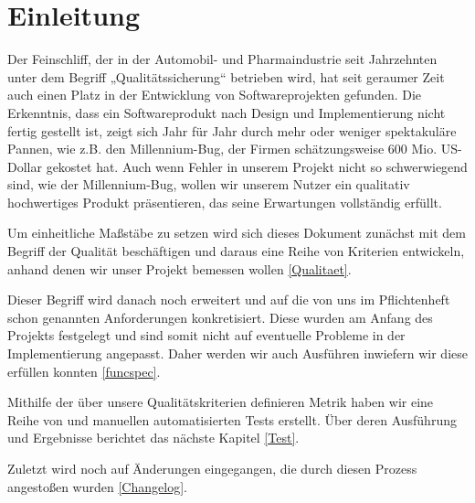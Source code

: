 \chapter{Einleitung} \label{Einleitung}

Der Feinschliff, der in der Automobil- und Pharmaindustrie seit Jahrzehnten unter dem Begriff „Qualitätssicherung“ betrieben wird, hat seit geraumer Zeit auch einen Platz in der Entwicklung von Softwareprojekten gefunden.
Die Erkenntnis, dass ein Softwareprodukt nach Design und Implementierung nicht fertig gestellt ist, zeigt sich Jahr für Jahr durch mehr oder weniger spektakuläre Pannen, wie z.B. den Millennium-Bug, der Firmen schätzungsweise 600 Mio. US-Dollar gekostet hat. Auch wenn Fehler in unserem Projekt nicht so schwerwiegend sind, wie der Millennium-Bug, wollen wir unserem Nutzer ein qualitativ hochwertiges Produkt präsentieren, das seine Erwartungen vollständig erfüllt. \\ \par
Um einheitliche Maßstäbe zu setzen wird sich dieses Dokument zunächst mit dem Begriff der Qualität beschäftigen und daraus eine Reihe von Kriterien entwickeln, anhand denen wir unser Projekt bemessen wollen \eqref{Qualitaet}. \\
\par
Dieser Begriff wird danach noch erweitert und auf die von uns im Pflichtenheft schon genannten Anforderungen konkretisiert. Diese wurden am Anfang des Projekts festgelegt und sind somit nicht auf eventuelle Probleme in der Implementierung angepasst. Daher werden wir auch Ausführen inwiefern wir diese erfüllen konnten \eqref{funcspec}. \\
\par
Mithilfe der über unsere Qualitätskriterien definieren Metrik haben wir eine Reihe von und manuellen automatisierten Tests erstellt. Über deren Ausführung und Ergebnisse berichtet das nächste Kapitel \eqref{Test}. \\
\par
Zuletzt wird noch auf Änderungen eingegangen, die durch diesen Prozess angestoßen wurden \eqref{Changelog}.